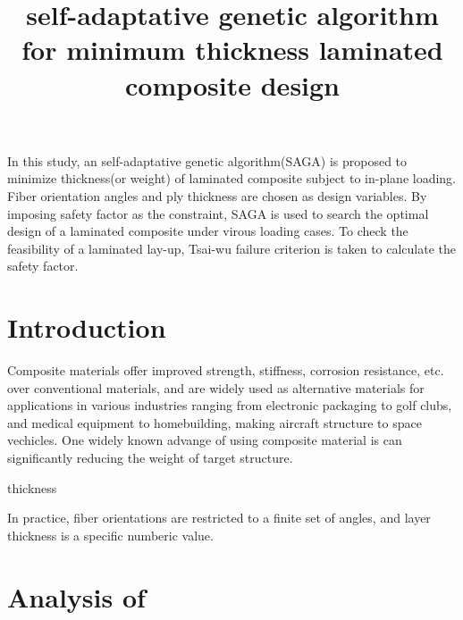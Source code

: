\documentclass{article}
\begin{document}
\title{self-adaptative genetic algorithm for minimum thickness laminated composite design}
In this study, an self-adaptative genetic algorithm(SAGA) is proposed to minimize thickness(or weight) of
laminated composite subject to in-plane loading. Fiber orientation angles and ply thickness are
chosen as design variables. By imposing safety factor as the constraint, SAGA is used to search the optimal design of a laminated composite under
virous loading cases. To check the feasibility of a laminated lay-up, Tsai-wu failure criterion is
taken to calculate the safety factor.



\section{Introduction}
Composite materials offer improved strength, stiffness, corrosion resistance, etc. over conventional
materials, and are widely used as alternative materials for applications in various industries
ranging from electronic packaging to golf clubs, and medical equipment to homebuilding, making
aircraft structure to space vechicles. One widely known advange of using composite material is can
significantly reducing the weight of target structure.  


thickness\cite { schmit1973optimum, schmit1977optimum, fukunaga1991strength, soares1995discrete,
	le1995improved, jayatheertha1996application, wang1996optimum, adali1997minimum,
	correia1997higher, scares1997optimization, abu1998optimum, lombardi1998anti, le1998design,
	sivakumar1998optimum, barakat1999use, richard2000reliability, moita2000sensitivity,
soremekun2001composite, walker2003technique, di2003multiconstrained, kere2003using}

In practice, fiber orientations are restricted to a finite set of angles, and layer thickness is
a specific numberic value. 

\section{Analysis of }
\end{document}
